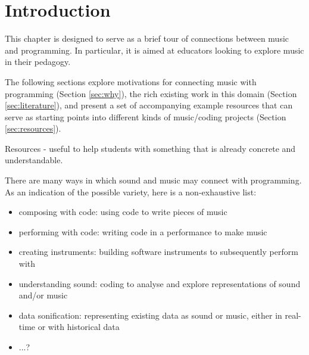 


\section{Introduction}

This chapter is designed to serve as a brief tour of connections between music and programming. In particular, it is aimed at educators looking to explore music in their pedagogy.

The following sections explore motivations for connecting music with programming (Section \ref{sec:why}), the rich existing work in this domain (Section \ref{sec:literature}), and present a set of accompanying example resources that can serve as starting points into different kinds of music/coding projects (Section \ref{sec:resources}).

Resources - useful to help students with something that is already concrete and understandable.


There are many ways in which sound and music may connect with programming. As an indication of the possible variety, here is a non-exhaustive list:

\begin{itemize}
    \item composing with code: using code to write pieces of music
    \item performing with code: writing code in a performance to make music
    \item creating instruments: building software instruments to subsequently perform with
    \item understanding sound: coding to analyse and explore representations of sound and/or music
    \item data sonification: representing existing data as sound or music, either in real-time or with  historical data
    \item ...?
\end{itemize}



